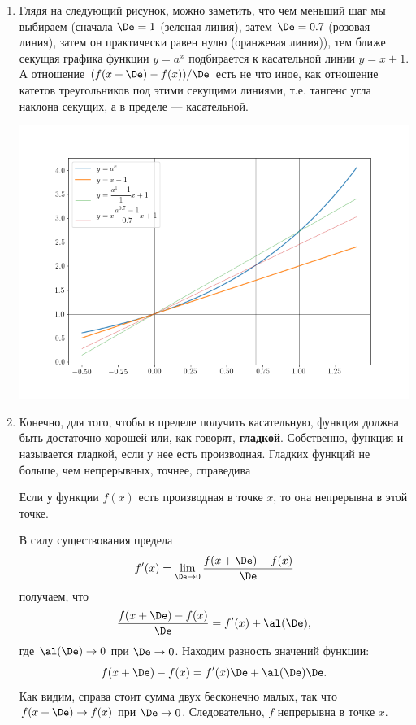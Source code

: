 \begin{enumerate}
\item Глядя на следующий рисунок, можно заметить, что чем меньший шаг мы выбираем (сначала $\De=1$ (зеленая линия), затем $\De=0.7$ (розовая линия), затем он практически равен нулю (оранжевая линия)), тем ближе секущая графика функции $y=a^x$ подбирается к касательной линии $y=x+1$. А отношение $(f(x+\De)-f(x))/\De$ есть не что иное, как отношение катетов треугольников под этими секущими линиями, т.е. тангенс угла наклона секущих, а в пределе --- касательной.
\begin{center}
\includegraphics[scale=0.5]{deriv.png}
\end{center}
\item Конечно, для того, чтобы в пределе получить касательную, функция должна быть достаточно хорошей или, как говорят, \textbf{гладкой}. Собственно, функция и называется гладкой, если у нее есть производная. Гладких функций не больше, чем непрерывных, точнее, справедива
\begin{thrm} Если у функции $f(x)$ есть производная в точке $x$, то она непрерывна в этой точке.
\end{thrm}
\pf
В силу существования предела
$$
f'(x)=\lim_{\De\to 0}\frac{f(x+\De)-f(x)}{\De}
$$
получаем, что
$$
\frac{f(x+\De)-f(x)}{\De}=f'(x)+\al(\De),
$$
где $\al(\De)\to 0$ при $\De\to 0$. Находим разность значений функции:
$$
f(x+\De)-f(x) = f'(x)\De+\al(\De)\De.
$$
Как видим, справа стоит сумма двух бесконечно малых, так что $f(x+\De)\to f(x)$ при $\De\to 0$. Следовательно, $f$ непрерывна в точке $x$.
\epf


\end{enumerate}
